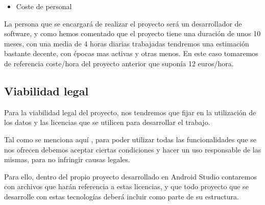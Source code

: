 \begin{itemize}
\item Coste de personal
\end{itemize}

La persona que se encargará de realizar el proyecto será un desarrollador de software, y como hemos comentado que el proyecto tiene una duración de unos 10 meses, con una media de 4 horas diarias trabajadas tendremos una estimación bastante decente, con épocas mas activas y otras menos. En este caso tomaremos de referencia coste/hora del proyecto anterior que suponía 12 euros/hora.

\subsection{Viabilidad legal}

Para la viabilidad legal del proyecto, nos tendremos que fijar en la utilización de los datos y las licencias que se utilicen para desarrollar el trabajo.

Tal como se menciona aquí \cite{terminos}, para poder utilizar todas las funcionalidades que se nos ofrecen debemos aceptar ciertas condiciones y hacer un uso responsable de las mismas, para no infringir causas legales.

Para ello, dentro del propio proyecto desarrollado en Android Studio contaremos con archivos que harán referencia a estas licencias, y que todo proyecto que se desarrolle con estas tecnologías deberá incluir como parte de su estructura.


